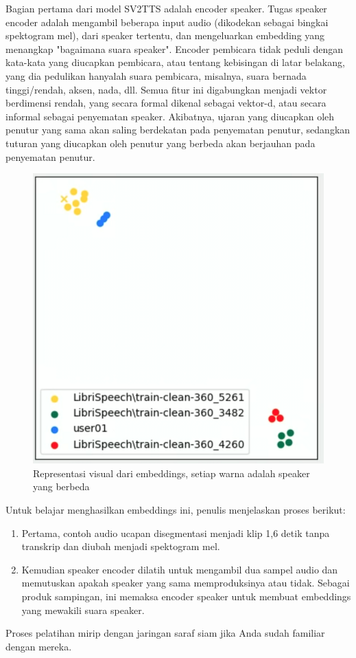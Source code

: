 Bagian pertama dari model SV2TTS adalah encoder speaker.
Tugas speaker encoder adalah mengambil beberapa input audio (dikodekan sebagai bingkai spektogram mel), dari speaker tertentu, dan mengeluarkan embedding yang menangkap "bagaimana suara speaker". Encoder pembicara tidak peduli dengan kata-kata yang diucapkan pembicara, atau tentang kebisingan di latar belakang, yang dia pedulikan hanyalah suara pembicara, misalnya, suara bernada tinggi/rendah, aksen, nada, dll. Semua fitur ini digabungkan menjadi vektor berdimensi rendah, yang secara formal dikenal sebagai vektor-d, atau secara informal sebagai penyematan speaker. Akibatnya, ujaran yang diucapkan oleh penutur yang sama akan saling berdekatan pada penyematan penutur, sedangkan tuturan yang diucapkan oleh penutur yang berbeda akan berjauhan pada penyematan penutur\cite{8999436, DBLP:journals/corr/HeigoldMBS15}.
\begin{figure}[H]
        \centerline{\includegraphics[scale=.35]{figures/encoder}}
        \caption{Representasi visual dari embeddings, setiap warna adalah speaker yang berbeda\cite{DBLP:journals/corr/abs-1806-04558}}
		\label{encoder}
\end{figure}

Untuk belajar menghasilkan embeddings ini, penulis menjelaskan proses berikut:
\begin{enumerate}
\item Pertama, contoh audio ucapan disegmentasi menjadi klip 1,6 detik tanpa transkrip dan diubah menjadi spektogram mel.
\item Kemudian speaker encoder dilatih untuk mengambil dua sampel audio dan memutuskan apakah speaker yang sama memproduksinya atau tidak. Sebagai produk sampingan, ini memaksa encoder speaker untuk membuat embeddings yang mewakili suara speaker.
\end{enumerate}
Proses pelatihan mirip dengan jaringan saraf siam jika Anda sudah familiar dengan mereka.

